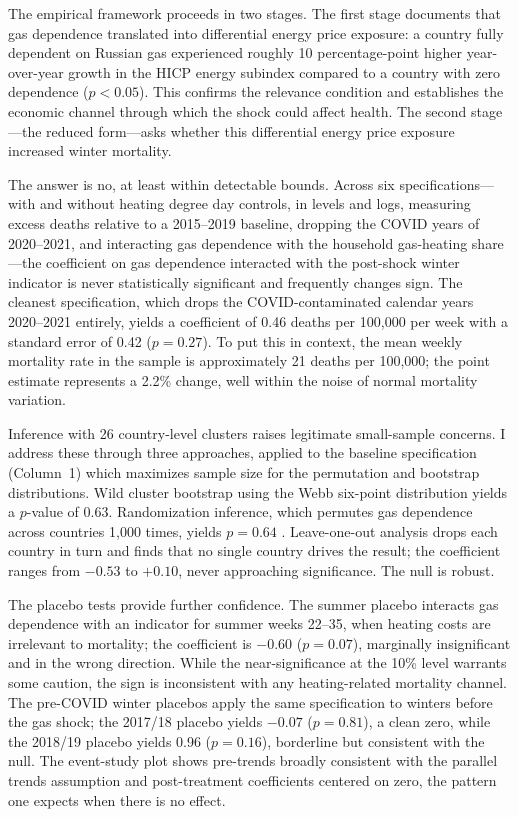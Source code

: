 \documentclass[12pt]{article}
\begin{document}
The empirical framework proceeds in two stages. The first stage documents that gas dependence translated into differential energy price exposure: a country fully dependent on Russian gas experienced roughly 10 percentage-point higher year-over-year growth in the HICP energy subindex compared to a country with zero dependence ($p < 0.05$). This confirms the relevance condition and establishes the economic channel through which the shock could affect health. The second stage---the reduced form---asks whether this differential energy price exposure increased winter mortality.

The answer is no, at least within detectable bounds. Across six specifications---with and without heating degree day controls, in levels and logs, measuring excess deaths relative to a 2015--2019 baseline, dropping the COVID years of 2020--2021, and interacting gas dependence with the household gas-heating share---the coefficient on gas dependence interacted with the post-shock winter indicator is never statistically significant and frequently changes sign. The cleanest specification, which drops the COVID-contaminated calendar years 2020--2021 entirely, yields a coefficient of 0.46 deaths per 100,000 per week with a standard error of 0.42 ($p = 0.27$). To put this in context, the mean weekly mortality rate in the sample is approximately 21 deaths per 100,000; the point estimate represents a 2.2\% change, well within the noise of normal mortality variation.

Inference with 26 country-level clusters raises legitimate small-sample concerns. I address these through three approaches, applied to the baseline specification (Column~1) which maximizes sample size for the permutation and bootstrap distributions. Wild cluster bootstrap using the Webb six-point distribution \citep{cameron2008, fischer2021} yields a $p$-value of 0.63. Randomization inference, which permutes gas dependence across countries 1,000 times, yields $p = 0.64$ \citep{conley2011}. Leave-one-out analysis drops each country in turn and finds that no single country drives the result; the coefficient ranges from $-0.53$ to $+0.10$, never approaching significance. The null is robust.

The placebo tests provide further confidence. The summer placebo interacts gas dependence with an indicator for summer weeks 22--35, when heating costs are irrelevant to mortality; the coefficient is $-0.60$ ($p = 0.07$), marginally insignificant and in the wrong direction. While the near-significance at the 10\% level warrants some caution, the sign is inconsistent with any heating-related mortality channel. The pre-COVID winter placebos apply the same specification to winters before the gas shock; the 2017/18 placebo yields $-0.07$ ($p = 0.81$), a clean zero, while the 2018/19 placebo yields 0.96 ($p = 0.16$), borderline but consistent with the null. The event-study plot shows pre-trends broadly consistent with the parallel trends assumption and post-treatment coefficients centered on zero, the pattern one expects when there is no effect.
\end{document}
